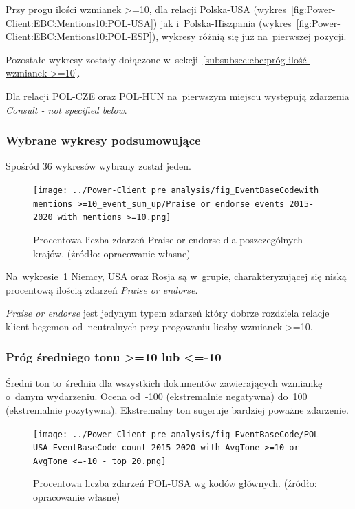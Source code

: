 \documentclass[11pt]{report}
\begin{document}
    Przy progu ilości wzmianek >=10, dla relacji Polska-USA (wykres~\ref{fig:Power-Client:EBC:Mentions10:POL-USA}) jak i~Polska-Hiszpania (wykres~\ref{fig:Power-Client:EBC:Mentions10:POL-ESP}),
    wykresy różnią się już na~pierwszej pozycji.

    Pozostałe wykresy zostały dołączone w~sekcji~\ref{subsubsec:ebc:próg-ilość-wzmianek->=10}.

    Dla relacji POL-CZE oraz POL-HUN na~pierwszym miejscu występują zdarzenia \textit{Consult - not specified below}.

    \subsubsection{Wybrane wykresy podsumowujące}

    Spośród 36 wykresów wybrany został jeden.

    \begin{figure}[tp]
        \centering
        \texttt{[image: ../Power-Client pre analysis/fig\_EventBaseCodewith mentions >=10\_event\_sum\_up/Praise or endorse events 2015-2020 with mentions >=10.png]}
        \caption{Procentowa liczba zdarzeń Praise or endorse dla poszczególnych krajów. (źródło: opracowanie własne)}
        \label{fig:Power-Client:ERC:Mentions10:SumUp:Praise or endorse}
    \end{figure}

    Na~wykresie~\ref{fig:Power-Client:ERC:Mentions10:SumUp:Praise or endorse} Niemcy, USA oraz Rosja są w~grupie,
    charakteryzującej się niską procentową ilością zdarzeń \textit{Praise or endorse}.

    \textit{Praise or endorse} jest jedynym typem zdarzeń który dobrze rozdziela relacje klient-hegemon od~neutralnych
    przy progowaniu liczby wzmianek >=10.

    \subsubsection{Próg średniego tonu >=10 lub <=-10}
    Średni ton to~średnia dla wszystkich dokumentów zawierających wzmiankę o~danym wydarzeniu.
    Ocena od~-100 (ekstremalnie negatywna) do~100 (ekstremalnie pozytywna).
    Ekstremalny ton sugeruje bardziej poważne zdarzenie.

    \begin{figure}[tp]
        \centering
        \texttt{[image: ../Power-Client pre analysis/fig\_EventBaseCode/POL-USA EventBaseCode count 2015-2020 with AvgTone >=10 or AvgTone <=-10 - top 20.png]}
        \caption{Procentowa liczba zdarzeń POL-USA wg kodów głównych. (źródło: opracowanie własne)}
        \label{fig:Power-Client:EBC:AvgToone10:POL-USA}
    \end{figure}
\end{document}
